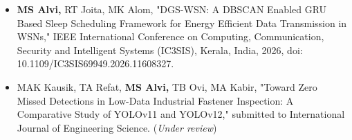 \begin{itemize}
  \item \textbf{MS Alvi,} RT Joita, MK Alom, "DGS-WSN: A DBSCAN Enabled GRU Based Sleep
  Scheduling Framework for Energy Efficient Data Transmission in WSNs," IEEE International Conference
  on Computing, Communication, Security and Intelligent Systems (IC3SIS), Kerala, India, 2026, doi: 10.1109/IC3SIS69949.2026.11608327.
  \item MAK Kausik, TA Refat, \textbf{MS Alvi,} TB Ovi, MA Kabir, "Toward Zero Missed Detections in Low-Data Industrial Fastener Inspection: A 
  Comparative Study of YOLOv11 and YOLOv12," submitted to International Journal of Engineering Science. (\textit{Under review})
\end{itemize}